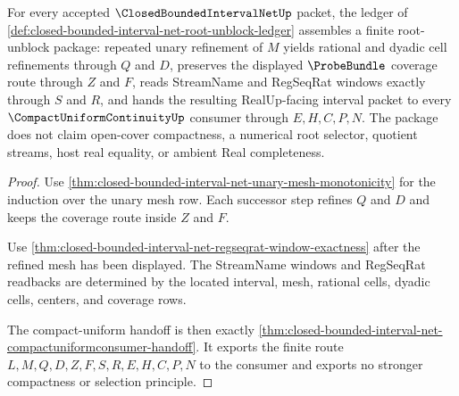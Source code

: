 \begin{theorem}
\label{thm:closed-bounded-interval-net-root-unblock-package}
For every accepted $\ClosedBoundedIntervalNetUp$ packet, the ledger of \autoref{def:closed-bounded-interval-net-root-unblock-ledger} assembles a finite root-unblock package: repeated unary refinement of $M$ yields rational and dyadic cell refinements through $Q$ and $D$, preserves the displayed $\ProbeBundle$ coverage route through $Z$ and $F$, reads StreamName and RegSeqRat windows exactly through $S$ and $R$, and hands the resulting RealUp-facing interval packet to every $\CompactUniformContinuityUp$ consumer through $E,H,C,P,N$. The package does not claim open-cover compactness, a numerical root selector, quotient streams, host real equality, or ambient Real completeness.
\end{theorem}
\begin{proof}
Use \autoref{thm:closed-bounded-interval-net-unary-mesh-monotonicity} for the induction over the unary mesh row. Each successor step refines $Q$ and $D$ and keeps the coverage route inside $Z$ and $F$.

Use \autoref{thm:closed-bounded-interval-net-regseqrat-window-exactness} after the refined mesh has been displayed. The StreamName windows and RegSeqRat readbacks are determined by the located interval, mesh, rational cells, dyadic cells, centers, and coverage rows.

The compact-uniform handoff is then exactly \autoref{thm:closed-bounded-interval-net-compactuniformconsumer-handoff}. It exports the finite route $L,M,Q,D,Z,F,S,R,E,H,C,P,N$ to the consumer and exports no stronger compactness or selection principle.
\end{proof}

